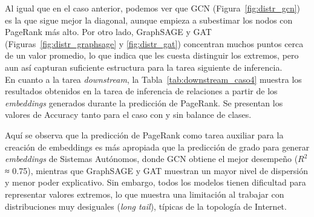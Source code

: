 Al igual que en el caso anterior, podemos ver que GCN (Figura~\ref{fig:distr_gcn}) es la que sigue mejor la diagonal, aunque empieza a subestimar los nodos con PageRank más alto. Por otro lado, GraphSAGE y GAT (Figuras~\ref{fig:distr_graphsage} y \ref{fig:distr_gat}) concentran muchos puntos cerca de un valor promedio, lo que indica que les cuesta distinguir los extremos, pero aun así capturan suficiente estructura para la tarea siguiente de inferencia.\\

En cuanto a la tarea \textit{downstream}, la Tabla~\ref{tab:downstream_caso4} muestra los resultados obtenidos en la tarea de inferencia de relaciones a partir de los \textit{embeddings} generados durante la predicción de PageRank. Se presentan los valores de Accuracy tanto para el caso con y sin balance de clases.\\




\begin{table}[H]
\centering
{}
\caption{Resultados de Precision, Recall y Accuracy (\%) por modelo GNN bajo dos configuraciones: sin balanceo de clases (`NoBatch-NoW') y con balanceo de clases (`NoBatch-W').}
\label{tab:downstream_caso4}
\end{table}



Aquí se observa que la predicción de PageRank como tarea auxiliar para la creación de embeddings es más apropiada que la predicción de grado para generar \textit{embeddings} de Sistemas Autónomos, donde GCN obtiene el mejor desempeño ($R^2$ ≈ 0.75), mientras que GraphSAGE y GAT muestran un mayor nivel de dispersión y menor poder explicativo. Sin embargo, todos los modelos tienen dificultad  para representar valores extremos, lo que muestra una limitación al trabajar con distribuciones muy desiguales (\textit{long tail}), típicas de la topología de Internet.\\




